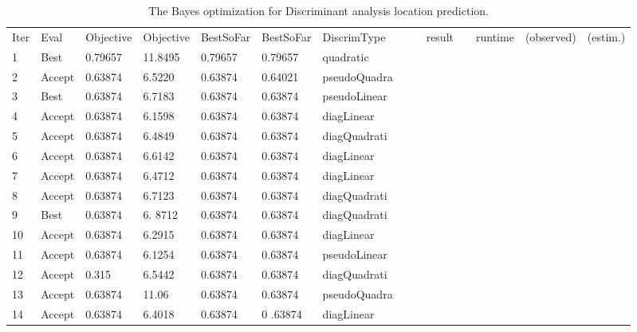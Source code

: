 \documentclass[5p]{elsarticle}
\begin{document}
\begin{frontmatter}
\begin{table}[h!]
\begin{center}
\begin{tabular}{l | l | l|l|l|l|l|l|l}
\hline
    \end{tabular}
  \end{center}
\end{table}


\begin{table}[h!]
  \small
  \begin{center}
    \caption{The Bayes optimization for Discriminant analysis location prediction.}
    \label{tab:table_2}
    \begin{tabular}{l | l | l|l|l|l|l|l|l}
\hline
 Iter & Eval   & Objective   & Objective   & BestSoFar   & BestSoFar   &  DiscrimType &
&      & result &             & runtime     & (observed)  & (estim.)    &              \\
1 & Best &         0.79657 &      11.8495 &        0.79657 &         0.79657 &    quadratic \\
2 & Accept &         0.63874 &       6.5220&         0.63874 &     0.64021 & pseudoQuadra \\
3 & Best &        0.63874 &      6.7183 &         0.63874 &         0.63874 & pseudoLinear \\
4 & Accept &         0.63874 &      6.1598 &         0.63874 &         0.63874 &   diagLinear \\
5 & Accept  &         0.63874  &      6.4849 &      0.63874 &     0.63874 & diagQuadrati \\
6 & Accept &         0.63874  &      6.6142&       0.63874 &        0.63874 &   diagLinear \\
7 & Accept &         0.63874 &      6.4712 &       0.63874 &        0.63874 &   diagLinear \\
8 & Accept &         0.63874 &       6.7123 &         0.63874 &        0.63874 & diagQuadrati \\
9 &   Best   &     0.63874   &      6. 8712&        0.63874   &        0.63874   & diagQuadrati \\
10 & Accept &       0.63874   &      6.2915&       0.63874   &         0.63874   &   diagLinear \\
11 & Accept &      0.63874   &      6.1254&        0.63874 &       0.63874  & pseudoLinear \\
12 & Accept  &        0.315   &      6.5442&         0.63874 &      0.63874& diagQuadrati \\
13 & Accept &    0.63874   &       11.06 &         0.63874 &       0.63874& pseudoQuadra \\
14 & Accept  &      0.63874  &      6.4018 &     0.63874&  0  .63874&   diagLinear \\

\end{tabular}
\end{center}
\end{table}
\end{frontmatter}
\end{document}
